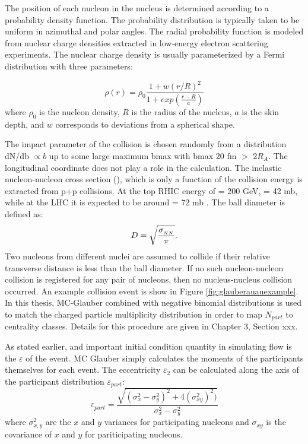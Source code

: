 The position of each nucleon in the nucleus is determined according to a probability density function. The probability distribution is typically taken to be uniform in azimuthal and polar angles. The radial probability function is modeled from nuclear charge densities extracted in low-energy electron scattering experiments. The nuclear charge density is usually parameterized by a Fermi distribution with three parameters:

\begin{equation}
\rho(r) = \rho_0\frac{1+w(r/R)^2}{1+exp(\frac{r-R}{a})}
\end{equation}
where $\rho_0$ is the nucleon density, $R$ is the radius of the nucleus, $a$ is the skin depth, and $w$ corresponds to deviations from a spherical shape. 

The impact parameter of the collision is chosen randomly from a distribution dN/db $\propto b$ up to some large maximum bmax with bmax 20 fm $>$ 2$R_A$. The longitudinal coordinate does not play a role in the calculation. The inelastic nucleon-nucleon cross section (\signn), which is only a function of the collision energy is extracted from p+p collisions. At the top RHIC energy of \sqsn = 200 GeV, \signn = 42 mb, while at the LHC it is expected to be around \signn = 72 mb \cite{annurev.nucl.57.090506.123020}. The ball diameter is defined as:
\begin{equation}
D = \sqrt{\frac{\mbox{$\sigma_{_{NN}}$}}{\pi}}.
\end{equation}
Two nucleons from different nuclei are assumed to collide if their relative transverse distance is less than the ball diameter. If no such nucleon-nucleon collision is registered for any pair of nucleons, then no nucleus-nucleus collision occurred. An example \auau collision event is show in Figure \ref{fig:glauberauauexample}. In this thesis, MC-Glauber combined with negative binomial distributions is used to match the charged particle multiplicity distribution in order to map $N_{part}$ to centrality classes. Details for this procedure are given in Chapter 3, Section xxx.

As stated earlier, and important initial condition quantity in simulating flow is the $\varepsilon$ of the event. MC Glauber simply calculates the moments of the participants themselves for each event. The eccentricity $\varepsilon_2$ can be calculated along the axis of the participant distribution $\varepsilon_{part}$:
\begin{equation}
\varepsilon_{part} = \frac{\sqrt{(\sigma_x^2-\sigma_y^2)^2+4(\sigma_{xy}^2)^2)}}{\sigma_x^2-\sigma_y^2}
\end{equation}
where $\sigma_{x,y}^2$ are the $x$ and $y$ variances for participating nucleons and $\sigma_{xy}$ is the covariance of $x$ and $y$ for pariticipating nucleons.

